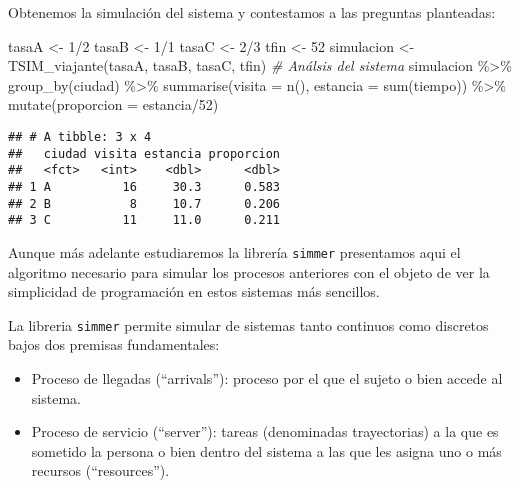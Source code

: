 \documentclass[
]{book}
\newenvironment{Shaded}{\begin{snugshade}}{\end{snugshade}}
\newcommand{\AttributeTok}[1]{\textcolor[rgb]{0.77,0.63,0.00}{#1}}
\newcommand{\CommentTok}[1]{\textcolor[rgb]{0.56,0.35,0.01}{\textit{#1}}}
\newcommand{\DecValTok}[1]{\textcolor[rgb]{0.00,0.00,0.81}{#1}}
\newcommand{\FunctionTok}[1]{\textcolor[rgb]{0.00,0.00,0.00}{#1}}
\newcommand{\NormalTok}[1]{#1}
\newcommand{\OtherTok}[1]{\textcolor[rgb]{0.56,0.35,0.01}{#1}}
\newcommand{\SpecialCharTok}[1]{\textcolor[rgb]{0.00,0.00,0.00}{#1}}
\providecommand{\tightlist}{%
  \setlength{\itemsep}{0pt}\setlength{\parskip}{0pt}}
\theoremstyle{definition}
\theoremstyle{definition}
\theoremstyle{definition}
\theoremstyle{definition}
\theoremstyle{remark}
\begin{document}
Obtenemos la simulación del sistema y contestamos a las preguntas planteadas:

\begin{Shaded}
\begin{Highlighting}[]
\NormalTok{tasaA }\OtherTok{\textless{}{-}} \DecValTok{1}\SpecialCharTok{/}\DecValTok{2}
\NormalTok{tasaB }\OtherTok{\textless{}{-}} \DecValTok{1}\SpecialCharTok{/}\DecValTok{1}
\NormalTok{tasaC }\OtherTok{\textless{}{-}} \DecValTok{2}\SpecialCharTok{/}\DecValTok{3}
\NormalTok{tfin }\OtherTok{\textless{}{-}} \DecValTok{52}
\NormalTok{simulacion }\OtherTok{\textless{}{-}} \FunctionTok{TSIM\_viajante}\NormalTok{(tasaA, tasaB, tasaC, tfin)  }
\CommentTok{\# Análsis del sistema}
\NormalTok{simulacion }\SpecialCharTok{\%\textgreater{}\%} 
  \FunctionTok{group\_by}\NormalTok{(ciudad) }\SpecialCharTok{\%\textgreater{}\%} 
  \FunctionTok{summarise}\NormalTok{(}\AttributeTok{visita =} \FunctionTok{n}\NormalTok{(), }\AttributeTok{estancia =} \FunctionTok{sum}\NormalTok{(tiempo)) }\SpecialCharTok{\%\textgreater{}\%}
  \FunctionTok{mutate}\NormalTok{(}\AttributeTok{proporcion =}\NormalTok{ estancia}\SpecialCharTok{/}\DecValTok{52}\NormalTok{)}
\end{Highlighting}
\end{Shaded}

\begin{verbatim}
## # A tibble: 3 x 4
##   ciudad visita estancia proporcion
##   <fct>   <int>    <dbl>      <dbl>
## 1 A          16     30.3      0.583
## 2 B           8     10.7      0.206
## 3 C          11     11.0      0.211
\end{verbatim}

Aunque más adelante estudiaremos la librería \texttt{simmer} presentamos aqui el algoritmo necesario para simular los procesos anteriores con el objeto de ver la simplicidad de programación en estos sistemas más sencillos.

La libreria \texttt{simmer} permite simular de sistemas tanto continuos como discretos bajos dos premisas fundamentales:

\begin{itemize}
\tightlist
\item
  Proceso de llegadas (``arrivals''): proceso por el que el sujeto o bien accede al sistema.
\item
  Proceso de servicio (``server''): tareas (denominadas trayectorias) a la que es sometido la persona o bien dentro del sistema a las que les asigna uno o más recursos (``resources'').
\end{itemize}
\end{document}
